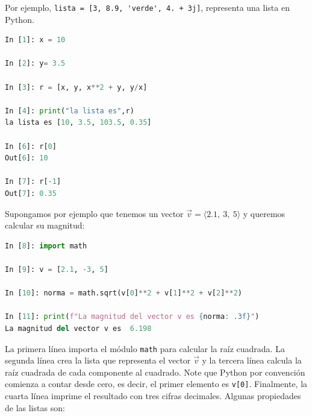 \documentclass[12pt]{article}
\begin{document}
    Por ejemplo, \lstinline|lista = [3, 8.9, 'verde', 4. + 3j]|, representa una lista en Python. 
%
\begin{lstlisting}[language=Python]
In [1]: x = 10

In [2]: y= 3.5

In [3]: r = [x, y, x**2 + y, y/x]

In [4]: print("la lista es",r)
la lista es [10, 3.5, 103.5, 0.35]

In [6]: r[0]
Out[6]: 10

In [7]: r[-1]
Out[7]: 0.35
\end{lstlisting}    
%
Supongamos por ejemplo que tenemos un vector $\vec v = \langle 2.1, ~3, ~5\rangle$ y queremos
calcular su magnitud:
%
\begin{lstlisting}[language=Python]
In [8]: import math

In [9]: v = [2.1, -3, 5]

In [10]: norma = math.sqrt(v[0]**2 + v[1]**2 + v[2]**2)

In [11]: print(f"La magnitud del vector v es {norma: .3f}")
La magnitud del vector v es  6.198
\end{lstlisting}    
%

La primera línea importa el módulo \lstinline|math| para calcular la raíz cuadrada.
La segunda línea crea la lista que representa el vector $\vec v$ y la tercera línea calcula la raíz
cuadrada de cada componente al cuadrado. Note que Python por convención comienza  a contar desde cero, 
es decir, el primer elemento es \lstinline|v[0]|. Finalmente, la cuarta línea imprime el resultado con tres 
cifras decimales. Algunas propiedades de las listas son:
\end{document}
